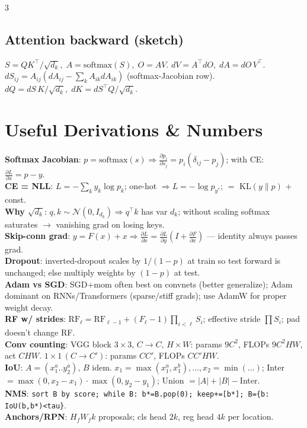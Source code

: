 \documentclass[a4paper,9pt,landscape]{scrartcl}
\newcommand{\softmax}{\mathrm{softmax}}
\newcommand{\dd}[2]{\frac{\partial #1}{\partial #2}}
\begin{document}
\begin{multicols*}{3}
\subsection{Attention backward (sketch)}
$S=QK^\top/\sqrt{d_k},\;A=\softmax(S),\;O=AV$.
$dV=A^\top dO,\;dA=dO\,V^\top$.
$dS_{ij}=A_{ij}(dA_{ij}-\sum_k A_{ik}dA_{ik})$ (softmax-Jacobian row).
$dQ=dS\,K/\sqrt{d_k},\;dK=dS^\top Q/\sqrt{d_k}$.

\section{Useful Derivations \& Numbers}
\textbf{Softmax Jacobian}: $p{=}\softmax(s)\Rightarrow\dd{p_i}{s_j}=p_i(\delta_{ij}-p_j)$; with CE: $\dd{L}{s}{=}p{-}y$.\\
\textbf{CE = NLL}: $L=-\sum_k y_k\log p_k$; one-hot $\Rightarrow L=-\log p_{y^*}$; $=$ KL$(y\|p)$ + const.\\
\textbf{Why $\sqrt{d_k}$}: $q,k\!\sim\!\mathcal N(0,I_{d_k})\!\Rightarrow\!q^\top k$ has var $d_k$; without scaling softmax saturates $\to$ vanishing grad on losing keys.\\
\textbf{Skip-conn grad}: $y{=}F(x){+}x\Rightarrow\dd{L}{x}{=}\dd{L}{y}(I+\dd{F}{x})$ — identity always passes grad.\\
\textbf{Dropout}: inverted-dropout scales by $1/(1{-}p)$ at train so test forward is unchanged; else multiply weights by $(1-p)$ at test.\\
\textbf{Adam vs SGD}: SGD+mom often best on convnets (better generalize); Adam dominant on RNNs/Transformers (sparse/stiff grads); use AdamW for proper weight decay.\\
\textbf{RF w/ strides}: $\text{RF}_\ell{=}\text{RF}_{\ell-1}+(F_\ell{-}1)\prod_{i<\ell}S_i$; effective stride $\prod S_i$; pad doesn't change RF.\\
\textbf{Conv counting}: VGG block $3{\times}3,\,C{\to}C,\,H{\times}W$: params $9C^2$, FLOPs $9C^2HW$, act $CHW$. $1{\times}1\,(C{\to}C')$: params $CC'$, FLOPs $CC'HW$.\\
\textbf{IoU}: $A{=}(x_1^a..y_2^a),\,B$ idem. $x_1{=}\max(x_1^a,x_1^b),\dots,x_2{=}\min(\dots)$; Inter $=\max(0,x_2{-}x_1)\!\cdot\!\max(0,y_2{-}y_1)$; Union $=|A|+|B|-$Inter.\\
\textbf{NMS}: \texttt{sort B by score; while B: b*=B.pop(0); keep+=[b*]; B=\{b: IoU(b,b*)<tau\}}.\\
\textbf{Anchors/RPN}: $H_fW_fk$ proposals; cls head $2k$, reg head $4k$ per location.\\

\end{multicols*}
\end{document}
